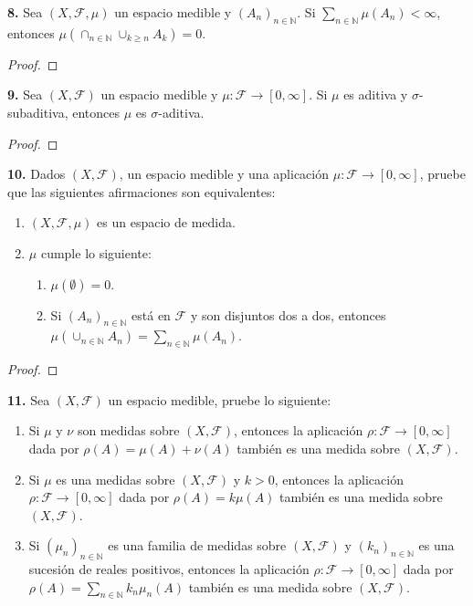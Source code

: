 \documentclass{article}
\newenvironment{statement}[1]{\smallskip\noindent\color[rgb]{1.00,0.00,0.50} {\bf #1.}}{}
\theoremstyle{definition}
\theoremstyle{remark}
\newcommand{\BN}{\mathbb N}
\begin{document}
\begin{statement}{8}
  Sea $(X, \mathcal{F}, \mu)$ un espacio medible y $(A_n)_{n \in \BN}$. Si $\sum_{n \in \BN} \mu(A_n) < \infty$, entonces $\mu(\cap_{n \in \BN} \cup_{k \geq n} A_k) = 0$.
\end{statement}

\begin{proof}
\end{proof}

\begin{statement}{9}
  Sea $(X, \mathcal{F})$ un espacio medible y $\mu: \mathcal{F} \to [0, \infty]$. Si $\mu$ es aditiva y $\sigma$-subaditiva, entonces $\mu$ es $\sigma$-aditiva.
\end{statement}

\begin{proof}
\end{proof}

\begin{statement}{10}
  Dados $(X, \mathcal{F})$, un espacio medible y una aplicaci\'on $\mu: \mathcal{F} \to [0, \infty]$, pruebe que las siguientes afirmaciones son equivalentes:
  \begin{enumerate}
    \item $(X, \mathcal{F}, \mu)$ es un espacio de medida.
    \item $\mu$ cumple lo siguiente:
      \begin{enumerate}
        \item $\mu(\emptyset) = 0$.
        \item Si $(A_n)_{n \in \BN}$ est\'a en $\mathcal{F}$ y son disjuntos dos a dos, entonces $\mu(\cup_{n \in \BN} A_n) = \sum_{n \in \BN} \mu(A_n)$.
      \end{enumerate}
  \end{enumerate}
\end{statement}

\begin{proof}
\end{proof}

\begin{statement}{11}
  Sea $(X, \mathcal{F})$ un espacio medible, pruebe lo siguiente:
  \begin{enumerate}
    \item Si $\mu$ y $\nu$ son medidas sobre $(X, \mathcal{F})$, entonces la aplicaci\'on $\rho: \mathcal{F} \to [0, \infty]$ dada por $\rho(A) = \mu(A) + \nu(A)$ tambi\'en es una medida sobre $(X, \mathcal{F})$.
    \item Si $\mu$ es una medidas sobre $(X, \mathcal{F})$ y $k > 0$, entonces la aplicaci\'on $\rho: \mathcal{F} \to [0, \infty]$ dada por $\rho(A) = k \mu(A)$ tambi\'en es una medida sobre $(X, \mathcal{F})$.
    \item Si $(\mu_n)_{n \in \BN}$ es una familia de medidas sobre $(X, \mathcal{F})$ y $(k_n)_{n \in \BN}$ es una sucesi\'on de reales positivos, entonces la aplicaci\'on $\rho: \mathcal{F} \to [0, \infty]$ dada por $\rho(A) = \sum_{n \in \BN} k_n \mu_n(A)$ tambi\'en es una medida sobre $(X, \mathcal{F})$.
  \end{enumerate}
\end{statement}
\end{document}
